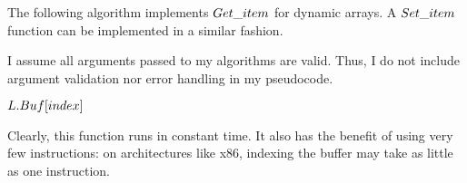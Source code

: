 \HdrDynArrayImpl

The following algorithm implements $\FuncGetItem$ for dynamic arrays. A $Set\_item$ function can be implemented in a similar fashion.

{\HdrNote} I assume all arguments passed to my algorithms are valid. Thus, I do not include argument validation nor error handling in my pseudocode.

\begin{algorithm}
	\begin{algorithmic}[1]
		\Function{$\FuncGetItem$}{$\VarList,\ \ParamIndex$}
			\State \Return $L.Buf[index]$
		\EndFunction
	\end{algorithmic}
\end{algorithm}

Clearly, this function runs in constant time. It also has the benefit of using very few instructions: on architectures like x86, indexing the buffer may take as little as one instruction.